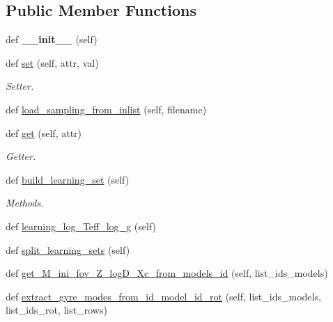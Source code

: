 \subsection*{Public Member Functions}
\begin{DoxyCompactItemize}
\item 
\mbox{\label{classasamba_1_1sampler_1_1sampling_a2551ddd4207eefb6dd3eb669ca92cc3e}} 
def {\bfseries \+\_\+\+\_\+init\+\_\+\+\_\+} (self)
\item 
def \hyperlink{classasamba_1_1sampler_1_1sampling_a682af8a360751e2fb6dd215fe571ea43}{set} (self, attr, val)
\begin{DoxyCompactList}\small\item\em Setter. \end{DoxyCompactList}\item 
def \hyperlink{classasamba_1_1sampler_1_1sampling_a55ebddb5056b66524d34341cccae5d05}{load\+\_\+sampling\+\_\+from\+\_\+inlist} (self, filename)
\item 
def \hyperlink{classasamba_1_1sampler_1_1sampling_a9e11f6bf4371b3dbe372dcc75c47ad3a}{get} (self, attr)
\begin{DoxyCompactList}\small\item\em Getter. \end{DoxyCompactList}\item 
def \hyperlink{classasamba_1_1sampler_1_1sampling_abb689acce45526b082697abe45e2cb56}{build\+\_\+learning\+\_\+set} (self)
\begin{DoxyCompactList}\small\item\em Methods. \end{DoxyCompactList}\item 
def \hyperlink{classasamba_1_1sampler_1_1sampling_ae9c349cf7e5114f9675f07e5b97ed628}{learning\+\_\+log\+\_\+\+Teff\+\_\+log\+\_\+g} (self)
\item 
def \hyperlink{classasamba_1_1sampler_1_1sampling_ae0e3548d71adf58b309904e65b0e6e8c}{split\+\_\+learning\+\_\+sets} (self)
\item 
def \hyperlink{classasamba_1_1sampler_1_1sampling_a64ed2afa6e77447a36512136da5b500a}{get\+\_\+\+M\+\_\+ini\+\_\+fov\+\_\+\+Z\+\_\+log\+D\+\_\+\+Xc\+\_\+from\+\_\+models\+\_\+id} (self, list\+\_\+ids\+\_\+models)
\item 
def \hyperlink{classasamba_1_1sampler_1_1sampling_abdedb54b26dfc7605977d2103ce050b0}{extract\+\_\+gyre\+\_\+modes\+\_\+from\+\_\+id\+\_\+model\+\_\+id\+\_\+rot} (self, list\+\_\+ids\+\_\+models, list\+\_\+ids\+\_\+rot, list\+\_\+rows)

\end{DoxyCompactItemize}
